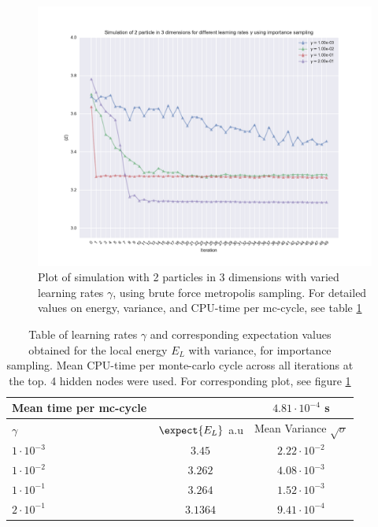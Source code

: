 \begin{figure}[h]
\hspace{-2.8cm}
\includegraphics[width = \paperwidth]{figures/importance_2p_3d.pdf}
\caption{Plot of simulation with 2 particles in 3 dimensions with varied learning rates $\gamma$, using brute force metropolis sampling.
			For detailed values on energy, variance, and CPU-time per mc-cycle, see table \ref{tab:importance-nin-gamma}}
\label{fig:importance-nin-gamma}
\end{figure}

\begin{table}[h]
\begin{tabular}{l c c}
	Mean time per mc-cycle & &$4.81\cdot10^{-4}$ s \\
	\hline
	$\gamma$ & $\expect{E_L}$ a.u & Mean Variance $\sqrt{\sigma}$\\
	\hline
	$1\cdot10^{-3}$ & $3.45$ & $2.22\cdot10^{-2}$ \\
	$1\cdot10^{-2}$ & $3.262$ & $4.08\cdot10^{-3}$ \\
	$1\cdot10^{-1}$ & $3.264$ & $1.52\cdot10^{-3}$ \\
	$2\cdot10^{-1}$ & $3.1364$ & $9.41\cdot10^{-4}$ \\
\end{tabular}
\label{tab:importance-nin-gamma}
\caption{Table of learning rates $\gamma$ and corresponding expectation values obtained for the local energy $E_L$ with variance, for importance sampling.
		Mean CPU-time per monte-carlo cycle across all iterations at the top. 4 hidden nodes were used.
	For corresponding plot, see figure \ref{fig:importance-nin-gamma}}
\end{table}

